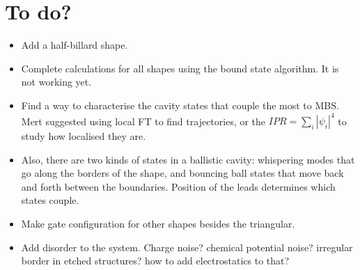 \documentclass[10pt,twocolumn,aps,superscriptaddress, floatfix,notitlepage]{revtex4-1}
\begin{document}
\section{To do?}

\begin{itemize}
\item Add a half-billard shape.
\item Complete calculations for all shapes using the bound state algorithm. It is not working yet.
\item Find a way to characterise the cavity states that couple the most to MBS. Mert suggested using local FT to find trajectories, or the $IPR=\sum_{i} |\psi_{i}|^{4}$ to study how localised they are. 
\item Also, there are two kinds of states in a ballistic cavity: whispering modes that go along the borders of the shape, and bouncing ball states that move back and forth between the boundaries. Position of the leads determines which states couple.
\item Make gate configuration for other shapes besides the triangular.
\item Add disorder to the system. Charge noise? chemical potential noise? irregular border in etched structures? how to add electrostatics to that?
\end{itemize}


\end{document}
